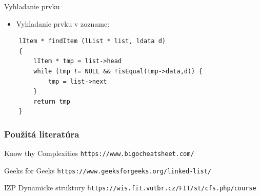 \documentclass[10pt,xcolor=pdflatex,hyperref={unicode}]{beamer}
\begin{document}
\begin {frame}[fragile]{Vyhladanie prvku}
\begin{itemize}
    \item {\color{keyword}Vyhladanie} prvku v zozname: 
\end{itemize}
    \begin{verbatim}
    lItem * findItem (lList * list, ldata d)
    {
        lItem * tmp = list->head
        while (tmp != NULL && !isEqual(tmp->data,d)) {
            tmp = list->next
        }
        return tmp
    }
    \end{verbatim}
\end{frame}
\begin{frame}
\frametitle{Použitá literatúra}
\begin{thebibliography}{10}
		 Know thy Complexities
		\newblock \texttt{https://www.bigocheatsheet.com/}

		 Geeks for Geeks
		\newblock \texttt{https://www.geeksforgeeks.org/linked-list/}

		 IZP Dynamicke struktury
		\newblock \texttt{https://wis.fit.vutbr.cz/FIT/st/cfs.php/course}
	\end{thebibliography}
\end{frame}
\end{document}

